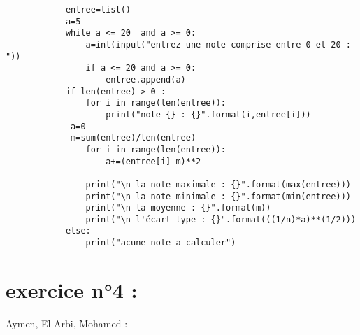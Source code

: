 \documentclass{article}
\begin{document}
    	\begin{verbatim}
			entree=list()
			a=5
			while a <= 20  and a >= 0:
    			a=int(input("entrez une note comprise entre 0 et 20 : "))
    			if a <= 20 and a >= 0:
        			entree.append(a) 
			if len(entree) > 0 :
    			for i in range(len(entree)):
        			print("note {} : {}".format(i,entree[i]))
   			 a=0
   			 m=sum(entree)/len(entree)
    			for i in range(len(entree)):
        			a+=(entree[i]-m)**2
    
    			print("\n la note maximale : {}".format(max(entree)))
    			print("\n la note minimale : {}".format(min(entree)))
    			print("\n la moyenne : {}".format(m))
    			print("\n l'écart type : {}".format(((1/n)*a)**(1/2)))
			else:
    			print("acune note a calculer")
		\end{verbatim}

\section{exercice n°4 :}
	\begin{center}
    		Aymen, El Arbi, Mohamed :
	\end{center}
	\begin{verbatim}
		
	\end{verbatim}
\end{document}
